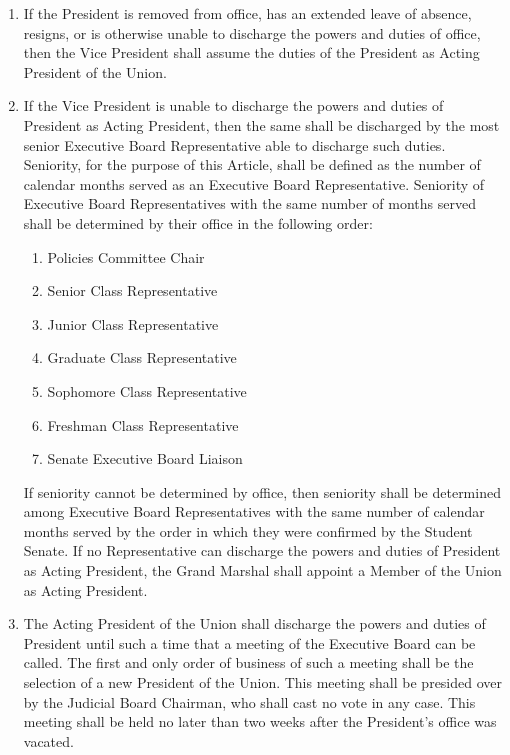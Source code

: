 \begin{enumerate}

    \item If the President is removed from office, has an extended leave of absence, resigns, or is otherwise unable to discharge the powers and duties of office, then the Vice President shall assume the duties of the President as Acting President of the Union.

    \item If the Vice President is unable to discharge the powers and duties of President as Acting President, then the same shall be discharged by the most senior Executive Board Representative able to discharge such duties. Seniority, for the purpose of this Article, shall be defined as the number of calendar months served as an Executive Board Representative. Seniority of Executive Board Representatives with the same number of months served shall be determined by their office in the following order:
    \begin{enumerate}
        \item Policies Committee Chair
        \item Senior Class Representative
        \item Junior Class Representative
        \item Graduate Class Representative
        \item Sophomore Class Representative
        \item Freshman Class Representative
        \item Senate Executive Board Liaison
    \end{enumerate}
    If seniority cannot be determined by office, then seniority shall be determined among Executive Board Representatives with the same number of calendar months served by the order in which they were confirmed by the Student Senate. If no Representative can discharge the powers and duties of President as Acting President, the Grand Marshal shall appoint a Member of the Union as Acting President.

    \item The Acting President of the Union shall discharge the powers and duties of President until such a time that a meeting of the Executive Board can be called. The first and only order of business of such a meeting shall be the selection of a new President of the Union. This meeting shall be presided over by the Judicial Board Chairman, who shall cast no vote in any case. This meeting shall be held no later than two weeks after the President’s office was vacated.


\end{enumerate}
